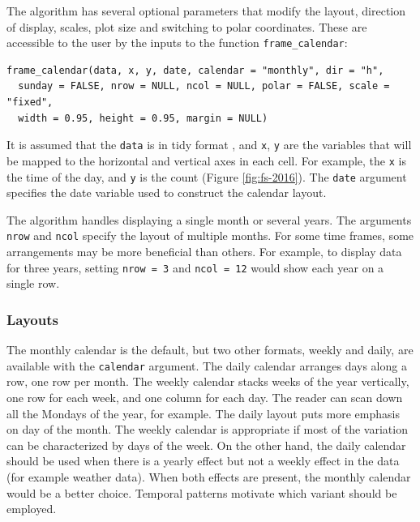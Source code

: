 \documentclass[12pt]{article}
\begin{document}
\label{sec:opt}

The algorithm has several optional parameters that modify the layout,
direction of display, scales, plot size and switching to polar
coordinates. These are accessible to the user by the inputs to the
function \texttt{frame\_calendar}:

\begin{verbatim}
frame_calendar(data, x, y, date, calendar = "monthly", dir = "h", 
  sunday = FALSE, nrow = NULL, ncol = NULL, polar = FALSE, scale = "fixed", 
  width = 0.95, height = 0.95, margin = NULL)
\end{verbatim}

It is assumed that the \texttt{data} is in tidy format
\citep{wickham2014tidy}, and \texttt{x}, \texttt{y} are the variables
that will be mapped to the horizontal and vertical axes in each cell.
For example, the \texttt{x} is the time of the day, and \texttt{y} is
the count (Figure \ref{fig:fs-2016}). The \texttt{date} argument
specifies the date variable used to construct the calendar layout.

The algorithm handles displaying a single month or several years. The
arguments \texttt{nrow} and \texttt{ncol} specify the layout of multiple
months. For some time frames, some arrangements may be more beneficial
than others. For example, to display data for three years, setting
\texttt{nrow\ =\ 3} and \texttt{ncol\ =\ 12} would show each year on a
single row.

\hypertarget{layouts}{%
\subsubsection{Layouts}\label{layouts}}

The monthly calendar is the default, but two other formats, weekly and
daily, are available with the \texttt{calendar} argument. The daily
calendar arranges days along a row, one row per month. The weekly
calendar stacks weeks of the year vertically, one row for each week, and
one column for each day. The reader can scan down all the Mondays of the
year, for example. The daily layout puts more emphasis on day of the
month. The weekly calendar is appropriate if most of the variation can
be characterized by days of the week. On the other hand, the daily
calendar should be used when there is a yearly effect but not a weekly
effect in the data (for example weather data). When both effects are
present, the monthly calendar would be a better choice. Temporal
patterns motivate which variant should be employed.
\end{document}
